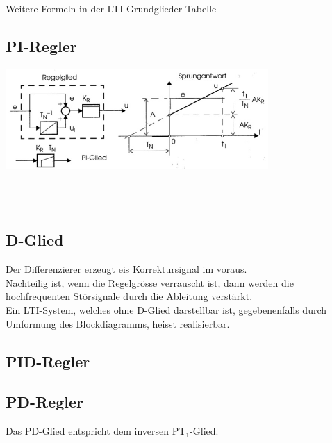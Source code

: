 		Weitere Formeln in der LTI-Grundglieder Tabelle
	
	\subsection{PI-Regler }
		\begin{minipage}{15cm}
        \includegraphics[angle={0},width=10cm]{./bilder/PI_Regler.jpg}
        \end{minipage}\\ \\
		\begin{minipage}{15cm}
        \qquad
        \end{minipage}
		
	
	\subsection{D-Glied }
		Der Differenzierer erzeugt eis Korrektursignal im voraus.\\
		Nachteilig ist, wenn die Regelgrösse verrauscht ist, dann werden die
		hochfrequenten Störsignale durch die Ableitung verstärkt.\\
		Ein LTI-System, welches ohne D-Glied darstellbar ist, gegebenenfalls durch
		Umformung des Blockdiagramms, heisst realisierbar.
	
	
	\subsection{PID-Regler  }
	
	\subsection{PD-Regler  }
	 \qquad
	Das PD-Glied entspricht dem inversen PT$_1$-Glied.
	
